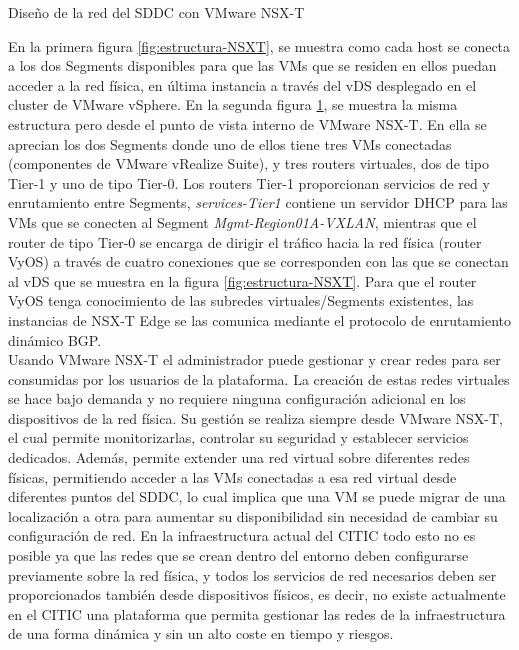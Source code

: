 \begin{subsubsection}{Diseño de la red del SDDC con VMware NSX-T}
\begin{figure}[h]
        \label{fig:two-tier-topology} 
    \end{figure}
    \FloatBarrier
    En la primera figura \ref{fig:estructura-NSXT}, se muestra como cada host se conecta a los dos Segments disponibles para que las VMs que se residen en ellos puedan acceder a la red física, en última instancia a través del vDS desplegado en el cluster de VMware vSphere. En la segunda figura \ref{fig:two-tier-topology}, se muestra la misma estructura pero desde el punto de vista interno de VMware NSX-T. En ella se aprecian los dos Segments donde uno de ellos tiene tres VMs conectadas (componentes de VMware vRealize Suite), y tres routers virtuales, dos de tipo Tier-1 y uno de tipo Tier-0. Los routers Tier-1 proporcionan servicios de red y enrutamiento entre Segments, \textit{services-Tier1} contiene un servidor DHCP  para las VMs que se conecten al Segment \textit{Mgmt-Region01A-VXLAN}, mientras que el router de tipo Tier-0 se encarga de dirigir el tráfico hacia la red física (router VyOS) a través de cuatro conexiones que se corresponden con las que se conectan al vDS que se muestra en la figura \ref{fig:estructura-NSXT}. Para que el router VyOS tenga conocimiento de las subredes virtuales/Segments existentes, las instancias de NSX-T Edge se las comunica mediante el protocolo de enrutamiento dinámico BGP.
    \\
    Usando VMware NSX-T el administrador puede gestionar y crear redes para ser consumidas por los usuarios de la plataforma. La creación de estas redes virtuales se hace bajo demanda y no requiere ninguna configuración adicional en los dispositivos de la red física. Su gestión se realiza siempre desde VMware NSX-T, el cual permite monitorizarlas, controlar su seguridad y establecer servicios dedicados. Además, permite extender una red virtual sobre diferentes redes físicas, permitiendo acceder a las VMs conectadas a esa red virtual desde diferentes puntos del SDDC, lo cual implica que una VM se puede migrar de una localización a otra para aumentar su disponibilidad sin necesidad de cambiar su configuración de red. En la infraestructura actual del CITIC todo esto no es posible ya que las redes que se crean dentro del entorno deben configurarse previamente sobre la red física, y todos los servicios de red necesarios deben ser proporcionados también desde dispositivos físicos, es decir, no existe actualmente en el CITIC una plataforma que permita gestionar las redes de la infraestructura de una forma dinámica y sin un alto coste en tiempo y riesgos.

\end{subsubsection}
